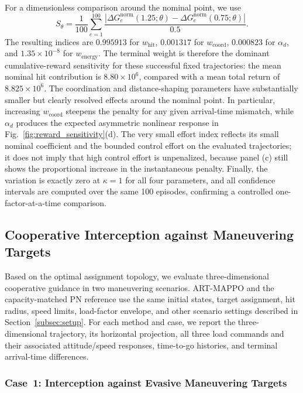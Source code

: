 \documentclass[lettersize,journal]{IEEEtran}
\begin{document}
For a dimensionless comparison around the nominal point, we use
\begin{equation}
\label{eq:local_reward_sensitivity}
S_{\theta}=\frac{1}{100}\sum_{e=1}^{100}
\frac{\left|\Delta G_e^{\mathrm{norm}}(1.25;\theta)
-\Delta G_e^{\mathrm{norm}}(0.75;\theta)\right|}{0.5}.
\end{equation}
The resulting indices are $0.995913$ for $w_{\mathrm{hit}}$, $0.001317$ for
$w_{\mathrm{coord}}$, $0.000823$ for $\alpha_d$, and
$1.35\times10^{-8}$ for $w_{\mathrm{energy}}$. The terminal weight is therefore the
dominant cumulative-reward sensitivity for these successful fixed trajectories: the mean
nominal hit contribution is $8.80\times10^6$, compared with a mean total return of
$8.825\times10^6$. The coordination and distance-shaping parameters have substantially
smaller but clearly resolved effects around the nominal point. In particular, increasing
$w_{\mathrm{coord}}$ steepens the penalty for any given arrival-time mismatch, while
$\alpha_d$ produces the expected asymmetric nonlinear response in
Fig.~\ref{fig:reward_sensitivity}(d). The very small effort index reflects its small nominal
coefficient and the bounded control effort on the evaluated trajectories; it does not imply
that high control effort is unpenalized, because panel (c) still shows the proportional
increase in the instantaneous penalty. Finally, the variation is exactly zero at
$\kappa=1$ for all four parameters, and all confidence intervals are computed over the same
100 episodes, confirming a controlled one-factor-at-a-time comparison.

\subsection{Cooperative Interception against Maneuvering Targets}
\label{subsec:cases}

Based on the optimal assignment topology, we evaluate three-dimensional cooperative guidance
in two maneuvering scenarios. ART-MAPPO and the capacity-matched PN reference use the same
initial states, target assignment, hit radius, speed limits, load-factor envelope, and other
scenario settings described in Section~\ref{subsec:setup}. For each
method and case, we report the three-dimensional trajectory, its horizontal projection, all
three load commands and their associated attitude/speed responses, time-to-go histories, and
terminal arrival-time differences.

\subsubsection{Case~1: Interception against Evasive Maneuvering Targets}
\end{document}
